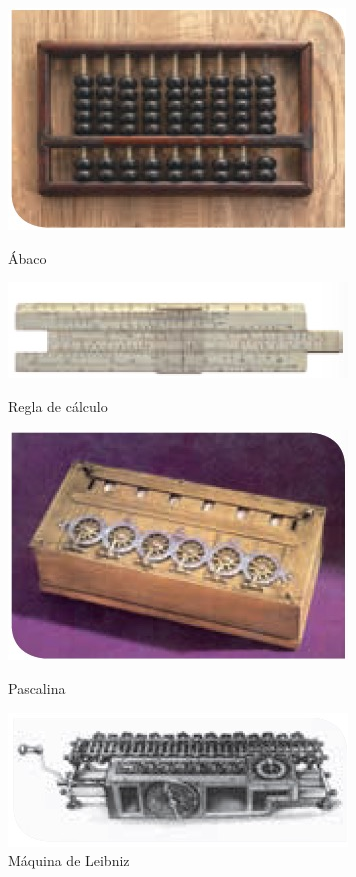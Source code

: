 \documentclass[11pt]{book}
\begin{document}
\begin{figure}[H]
    \begin{minipage}[b]{0.5\linewidth}
        \centering
        \includegraphics[width=0.7\linewidth]{abaco.jpg}
        \caption{\'Abaco}
        \label{fig:a}
    \end{minipage}%
    \begin{minipage}[b]{0.5\linewidth}
        \centering
        \includegraphics[width=0.7\linewidth]{regla_calculo.jpg}
        \caption{Regla de c\'alculo}
        \label{fig:b}
    \end{minipage}
    \begin{minipage}[b]{0.5\linewidth}
        \centering
        \includegraphics[width=0.7\linewidth]{pascalina.jpg}
        \caption{Pascalina}
        \label{fig:c}
    \end{minipage}%
    \begin{minipage}[b]{0.5\linewidth}
        \centering
        \includegraphics[width=0.7\linewidth]{maquina_Leibniz.jpg}
        \caption{M\'aquina de Leibniz}
        \label{fig:d}
    \end{minipage}
    \label{fig:fig7}
\end{figure}
\end{document}

